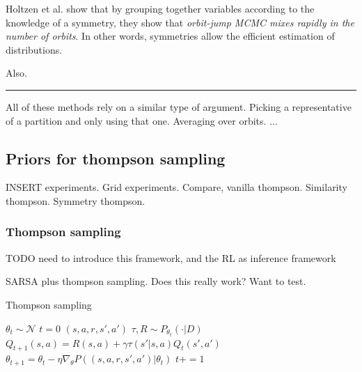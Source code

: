 Holtzen et al. \cite{Holtzen2019} show that by grouping together variables according to
the knowledge of a symmetry, they show that \textit{orbit-jump MCMC mixes rapidly in the number of orbits}.
In other words, symmetries allow the efficient estimation of distributions.

Also. \cite{Campbell2019}

\begin{center}\rule{0.5\linewidth}{\linethickness}\end{center}

All of these methods rely on a similar type of argument. Picking a representative
of a partition and only using that one. Averaging over orbits. ...

\subsection{Priors for thompson sampling} \label{thompson-sampling}

{\color{red}INSERT experiments.}
Grid experiments. Compare, vanilla thompson. Similarity thompson. Symmetry thompson.

\subsubsection{Thompson sampling}

{\color{red}TODO need to introduce this framework, and the RL as inference framework}

SARSA plus thompson sampling. Does this really work? Want to test.

\begin{algorithm}
	\caption{Thompson sampling}
	\begin{algorithmic}[1]

		\State $\theta_t \sim \mathcal N$
		\State $t=0$
		\State $(s, a, r, s', a')$ 
		\State $\tau, R \sim P_{\theta_t}(\cdot | D)$ 
		\State $Q_{t+1}(s, a) = R(s, a) + \gamma \tau(s'| s, a) Q_t(s', a')$ 
		\State $\theta_{t+1} = \theta_t - \eta \nabla_{\theta} P((s, a, r, s', a')| \theta_t)$ 
		\State $t += 1$

		\EndWhile
		\State \algorithmicreturn{ $\pi$}
		\EndProcedure

	\end{algorithmic}
\end{algorithm}

